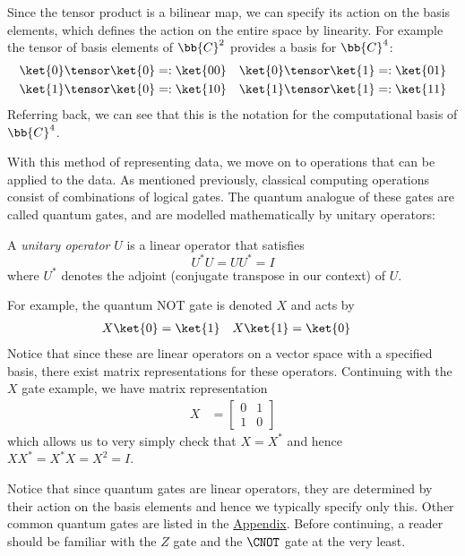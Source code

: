 \documentclass{article}
\begin{document}
        Since the tensor product is a bilinear map, we can specify its action on the basis elements, which defines the action on the entire space by linearity.
        For example the tensor of basis elements of $\bb{C}^2$ provides a basis for $\bb{C}^4$:
        \begin{align*}
        \ket{0} \tensor \ket{0} &=: \ket{00} & \ket{0} \tensor \ket{1} &=: \ket{01}\\
        \ket{1} \tensor \ket{0} &=: \ket{10} & \ket{1} \tensor \ket{1} &=: \ket{11}
        \end{align*}
        Referring back, we can see that this is the notation for the computational basis of $\bb{C}^4$.

        With this method of representing data, we move on to operations that can be applied to the data.
        As mentioned previously, classical computing operations consist of combinations of logical gates.
        The quantum analogue of these gates are called quantum gates, and are modelled mathematically by unitary operators:

        \begin{definition}
                A \textit{unitary operator} $U$ is a linear operator that satisfies
                        $$U^* U = UU^* = I$$
                where $U^*$ denotes the adjoint (conjugate transpose in our context) of $U$.
        \end{definition}

        For example, the quantum NOT gate is denoted $X$ and acts by
        \begin{align*}
                X \ket{0} &= \ket{1} & X \ket{1} &= \ket{0}
        \end{align*}
        Notice that since these are linear operators on a vector space with a specified basis, there exist matrix representations for these operators.
        Continuing with the $X$ gate example, we have matrix representation
        \begin{align*}
        X &= \begin{bmatrix} 0 & 1 \\ 1 & 0 \end{bmatrix}
        \end{align*}
        which allows us to very simply check that $X = X^*$ and hence $XX^* = X^* X = X^2 = I$.

        Notice that since quantum gates are linear operators, they are determined by their action on the basis elements and hence we typically specify only this.
        Other common quantum gates are listed in the \hyperref[appendix]{Appendix}.
        Before continuing, a reader should be familiar with the $Z$ gate and the $\CNOT$ gate at the very least.
        
\end{document}
